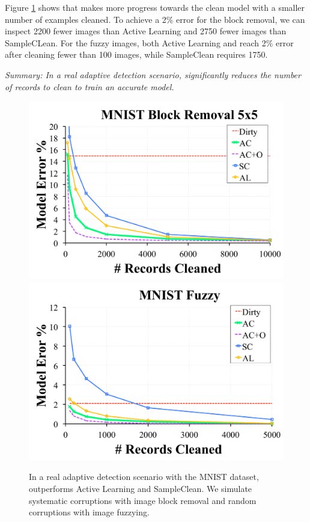 Figure \ref{mnist} shows that \sys makes more progress towards the clean model with a smaller number of examples cleaned.
To achieve a 2\% error for the block removal, we can inspect 2200 fewer images than Active Learning and 2750 fewer images than SampleCLean.
For the fuzzy images, both Active Learning and \sys reach 2\% error after cleaning fewer than 100 images, while SampleClean requires 1750.

\vspace{0.25em}

\noindent \emph{Summary: In a real adaptive detection scenario, \sys significantly reduces the number of records to clean to train an accurate model. }

\begin{figure}[ht]
\centering
 \includegraphics[width=0.49\columnwidth]{exp/exp7a.pdf}
 \includegraphics[width=0.49\columnwidth]{exp/exp7b.pdf}
 \caption{In a real adaptive detection scenario with the MNIST dataset, \sys outperforms Active Learning and SampleClean. We simulate systematic corruptions with image block removal and random corruptions with image fuzzying.  \label{mnist}}
\end{figure}
